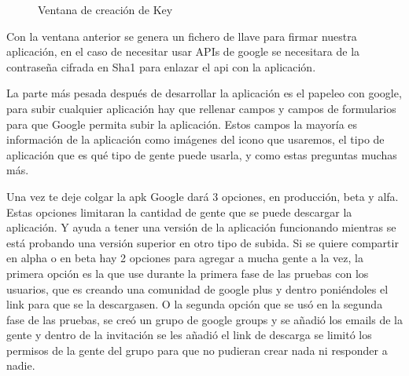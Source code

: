 \begin{figure}[H] 
  \begin{center} 
    \caption{Ventana de creación de Key} 
    \label{fig:CreaciónKey} 
  \end{center} 
\end{figure}

Con la ventana anterior se genera un fichero de llave para firmar nuestra aplicación, en el caso de necesitar usar APIs de google se necesitara de la contraseña cifrada en Sha1 para enlazar el api con la aplicación.

La parte más pesada después de desarrollar la aplicación es el papeleo con google, para subir cualquier aplicación hay que rellenar campos y campos de formularios para que Google permita subir la aplicación. Estos campos la mayoría es información de la aplicación como imágenes del icono que usaremos, el tipo de aplicación que es qué tipo de gente puede usarla, y como estas preguntas muchas más.

Una vez te deje colgar la apk Google dará 3 opciones,  en producción, beta  y alfa. Estas opciones limitaran la cantidad de gente que se puede descargar la aplicación. Y ayuda a tener una versión de la aplicación funcionando mientras se está probando una versión superior en otro tipo de subida. 
Si se quiere compartir en alpha o en beta hay 2 opciones para agregar a mucha gente a la vez, la primera opción es la que use durante la primera fase de las pruebas con los usuarios, que es creando una comunidad de google plus y dentro poniéndoles el link para que se la descargasen. O la segunda opción que se usó en la segunda fase de las pruebas, se creó un grupo de google groups y se añadió los emails de la gente y dentro de la invitación se les añadió el link de descarga se limitó los permisos de la gente del grupo para que no pudieran crear nada ni responder a nadie.


